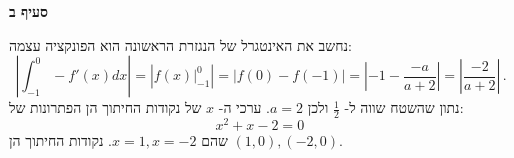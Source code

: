\textbf{סעיף ב}

נחשב את האינטגרל של הנגזרת הראשונה הוא הפונקציה עצמה:
\[
\left|\int_{-1}^0 -f'(x) dx\right| = \left|\left.f(x)\right|_{-1}^0\right|=\left|f(0)-f(-1)\right|=\left|-1-\frac{-a}{a+2}\right|=\left|\frac{-2}{a+2}\right|\,.
\]
נתון שהשטח שווה ל-%
$\frac{1}{2}$
ולכן 
$a=2$.
ערכי ה-%
$x$
של נקודות החיתוך הן הפתרונות של:
\[
x^2+x-2=0\,
\]
שהם
$x=1,x=-2$.
נקודות החיתוך הן
$(1,0), (-2,0)$.


